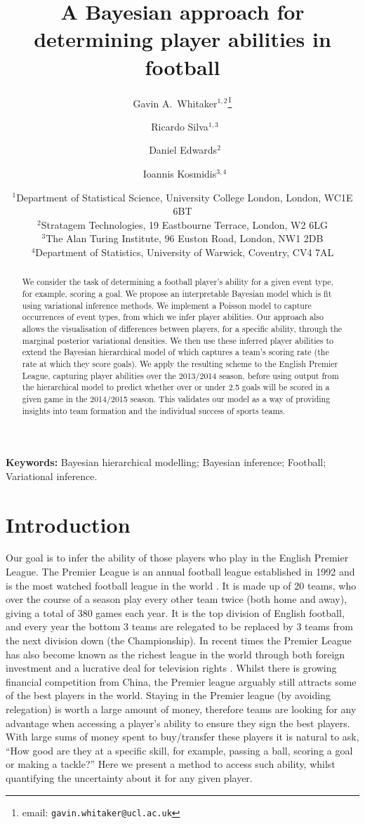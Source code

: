 \documentclass[11pt,a4paper]{article}
\title{A Bayesian approach for determining player abilities in football}
\author{Gavin A.~Whitaker$^{1,2}$\thanks{email: \texttt{gavin.whitaker@ucl.ac.uk}} \and\ Ricardo Silva$^{1,3}$ \and\ Daniel Edwards$^2$ \and\ Ioannis Kosmidis$^{3,4}$}
\date{\small $^{1}$Department of Statistical Science, University College London, London, WC1E 6BT \\
$^{2}$Stratagem Technologies, 19 Eastbourne Terrace, London, W2 6LG \\
$^{3}$The Alan Turing Institute, 96 Euston Road, London, NW1 2DB\\
$^{4}$Department of Statistics, University of Warwick, Coventry, CV4 7AL}
\begin{document}
\maketitle
\begin{abstract}
We consider the task of determining a football player's 
ability for a given event type, for example, scoring a goal. We propose 
an interpretable Bayesian model which is fit using 
variational inference methods. We implement a Poisson model to capture  
occurrences of event types, from which we infer player abilities. Our 
approach also allows the visualisation of differences between players, 
for a specific ability, through the marginal posterior variational 
densities. We then use these inferred player abilities to extend the 
Bayesian hierarchical model of \cite{baio_2010} which captures a 
team's scoring rate (the rate at which they score goals). We apply the 
resulting scheme to the English Premier League, capturing player 
abilities over the 2013/2014 season, before using output from the  
hierarchical model to predict whether over or under 2.5 goals will be 
scored in a given game in the 2014/2015 season. This validates 
our model as a way of providing insights into team formation and the 
individual success of sports teams.
\end{abstract}

\noindent\textbf{Keywords:} Bayesian hierarchical modelling; Bayesian inference; Football; Variational inference.






\section{Introduction} \label{intro}

Our goal is to infer the ability of those players 
who play in the English Premier League. The Premier League is an 
annual football league established in 1992 and is the most 
watched football league in the world \citep{yueh_2014, curley_2016}. 
It is made up of 20 teams, who over the course of a season play every 
other team twice (both home and away), giving a total of 380 games 
each year. It is the top division of English football, and every year 
the bottom 3 teams are relegated to be replaced by 3 teams from the 
next division down (the Championship). In recent times the Premier 
League has also become known as the richest league in the world 
\citep{deloitte_2016} through both foreign investment and a 
lucrative deal for television rights \citep{cave_2016, rumsby_2016, bbc_2015}. 
Whilst there is growing financial competition from China, the Premier 
league arguably still attracts some of the best players in the world. 
Staying in the Premier league (by avoiding relegation) is worth a 
large amount of money, therefore teams are looking for any advantage 
when accessing a player's ability to ensure they sign the best players.
With large sums of money spent to buy/transfer these 
players it is natural to ask, ``How good are they at a specific skill, 
for example, passing a ball, scoring a goal or making a tackle?'' 
Here we present a method to access such ability, whilst quantifying 
the uncertainty about it for any given player.
\end{document}
